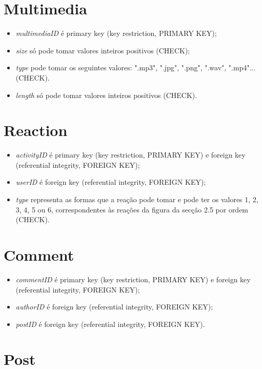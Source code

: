 \documentclass[12pt]{report}
\begin{document}
\section{Multimedia}

\begin{itemize}
    \item \textit{multimediaID} é primary key (key restriction, PRIMARY KEY);
    \item \textit{size} só pode tomar valores inteiros positivos (CHECK);
    \item \textit{type} pode tomar os seguintes valores: ".mp3", ".jpg", ".png", ".wav", ".mp4"... (CHECK).
    \item \textit{length} só pode tomar valores inteiros positivos (CHECK).
\end{itemize}

\section{Reaction}

\begin{itemize}
    \item \textit{activityID} é primary key (key restriction, PRIMARY KEY) e foreign key (referential integrity, FOREIGN KEY);
    \item \textit{userID} é foreign key (referential integrity, FOREIGN KEY);
    \item \textit{type} representa as formas que a reação pode tomar e pode ter os valores 1, 2, 3, 4, 5 ou 6, correspondentes às reações da figura da secção 2.5 por ordem (CHECK).
\end{itemize}

\section{Comment}

\begin{itemize}
    \item \textit{commentID} é primary key (key restriction, PRIMARY KEY) e foreign key (referential integrity, FOREIGN KEY);
    \item \textit{authorID} é foreign key (referential integrity, FOREIGN KEY);
    \item \textit{postID} é foreign key (referential integrity, FOREIGN KEY).
\end{itemize}

\section{Post}
\end{document}
